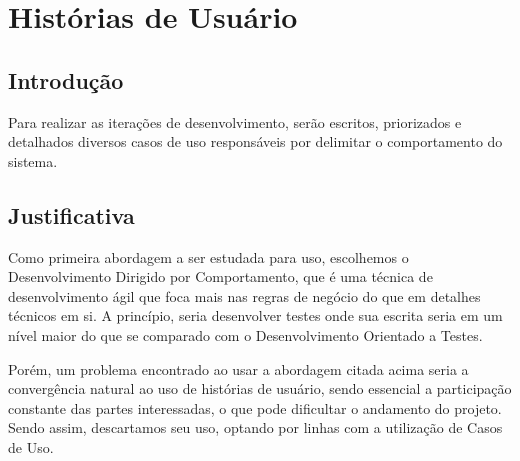 \chapter{Histórias de Usuário}

\section{Introdução}
Para realizar as iterações de desenvolvimento, serão escritos, priorizados e detalhados diversos casos de uso responsáveis por delimitar o comportamento do sistema.

\section{Justificativa}
Como primeira abordagem a ser estudada para uso, escolhemos o Desenvolvimento Dirigido por Comportamento, que é uma técnica de desenvolvimento ágil que foca mais nas regras de negócio do que em detalhes técnicos em si. A princípio, seria desenvolver testes onde sua escrita seria em um nível maior do que se comparado com o Desenvolvimento Orientado a Testes.

Porém, um problema encontrado ao usar a abordagem citada acima seria a convergência natural ao uso de histórias de usuário, sendo essencial a participação constante das partes interessadas, o que pode dificultar o andamento do projeto. Sendo assim, descartamos seu uso, optando por linhas com a utilização de Casos de Uso.
